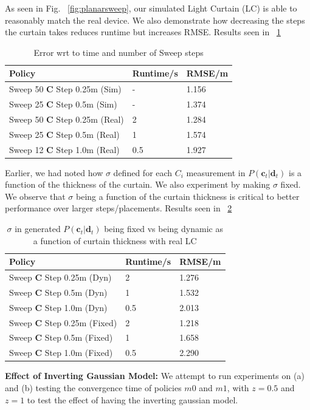 As seen in Fig. ~\ref{fig:planarsweep}, our simulated Light Curtain (LC) is able to reasonably match the real device. We also demonstrate how decreasing the steps the curtain takes reduces runtime but increases RMSE. Results seen in ~\ref{table:t1}

\begin{table}[h]
   \centering
   \begin{tabular}{|l|l|l|}
   \hline
    Policy&  Runtime/s&  RMSE/m\\ \hline
    Sweep 50 $\mathbf{C}$ Step 0.25m (Sim) &-  &1.156  \\ \hline
    Sweep 25 $\mathbf{C}$ Step 0.5m  (Sim) &-  &1.374  \\ \hline
    Sweep 50 $\mathbf{C}$ Step 0.25m (Real) &2  &1.284  \\ \hline
    Sweep 25 $\mathbf{C}$ Step 0.5m  (Real) &1  &1.574  \\ \hline
    Sweep 12 $\mathbf{C}$ Step 1.0m (Real) &0.5  &1.927  \\ \hline
   \end{tabular}
   \caption{Error wrt to time and number of Sweep steps}
   \label{table:t1}
\end{table}

Earlier, we had noted how $\sigma$ defined for each $C_{i}$ measurement in $P\left(\mathbf{c}_{t}|\mathbf{d}_{t}\right)$ is a function of the thickness of the curtain. We also experiment by making $\sigma$ fixed. We observe that $\sigma$ being a function of the curtain thickness is critical to better performance over larger steps/placements. Results seen in ~\ref{table:t2}

\begin{table}[h]
   \centering
   \begin{tabular}{|l|l|l|}
   \hline
    Policy&  Runtime/s&  RMSE/m\\ \hline
    Sweep $\mathbf{C}$ Step 0.25m (Dyn) &2  &1.276  \\ \hline
    Sweep $\mathbf{C}$ Step 0.5m  (Dyn) &1  &1.532  \\ \hline
    Sweep $\mathbf{C}$ Step 1.0m (Dyn) &0.5  &2.013  \\ \hline
    Sweep $\mathbf{C}$ Step 0.25m (Fixed) &2  &1.218  \\ \hline
    Sweep $\mathbf{C}$ Step 0.5m  (Fixed) &1  &1.658  \\ \hline
    Sweep $\mathbf{C}$ Step 1.0m (Fixed) &0.5  &2.290  \\ \hline
   \end{tabular}
   \caption{$\sigma$ in generated $P\left(\mathbf{c}_{t}|\mathbf{d}_{t}\right)$ being fixed vs being dynamic as a function of curtain thickness with real LC}
   \label{table:t2}
\end{table}

\textbf{Effect of Inverting Gaussian Model:} We attempt to run experiments on (a) and (b) testing the convergence time of policies $m0$ and $m1$, with $z=0.5$ and $z=1$ to test the effect of having the inverting gaussian model.




